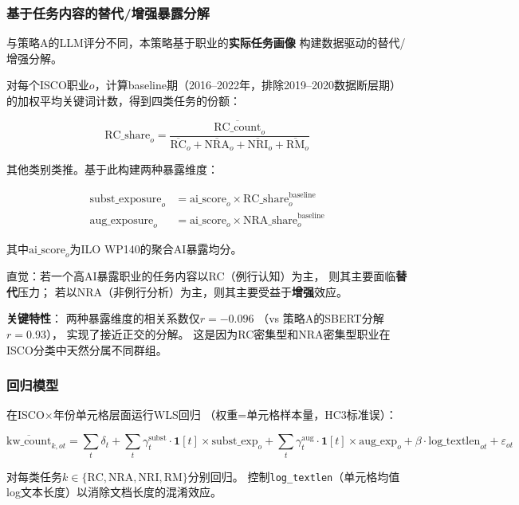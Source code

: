 \documentclass[12pt,a4paper]{ctexart}
\begin{document}
\subsubsection{基于任务内容的替代/增强暴露分解}

与策略A的LLM评分不同，本策略基于职业的\textbf{实际任务画像}
构建数据驱动的替代/增强分解。

对每个ISCO职业$o$，计算baseline期（2016--2022年，排除2019--2020数据断层期）
的加权平均关键词计数，得到四类任务的份额：

\[
\text{RC\_share}_o = \frac{\overline{\text{RC\_count}}_o}
{\overline{\text{RC}}_o + \overline{\text{NRA}}_o + \overline{\text{NRI}}_o + \overline{\text{RM}}_o}
\]

其他类别类推。基于此构建两种暴露维度：

\begin{align}
\text{subst\_exposure}_o &= \text{ai\_score}_o \times \text{RC\_share}_o^{\text{baseline}}
\label{eq:subst} \\
\text{aug\_exposure}_o &= \text{ai\_score}_o \times \text{NRA\_share}_o^{\text{baseline}}
\label{eq:aug}
\end{align}

其中$\text{ai\_score}_o$为ILO WP140的聚合AI暴露均分。

直觉：若一个高AI暴露职业的任务内容以RC（例行认知）为主，
则其主要面临\textbf{替代}压力；
若以NRA（非例行分析）为主，则其主要受益于\textbf{增强}效应。

\textbf{关键特性}：
两种暴露维度的相关系数仅$r = -0.096$
（vs 策略A的SBERT分解$r=0.93$），
实现了接近正交的分解。
这是因为RC密集型和NRA密集型职业在ISCO分类中天然分属不同群组。

\subsubsection{回归模型}

在ISCO$\times$年份单元格层面运行WLS回归
（权重=单元格样本量，HC3标准误）：

\begin{equation}
\overline{\text{kw\_count}}_{k,ot} = \sum_t \delta_t
+ \sum_t \gamma_t^{\text{subst}} \cdot \mathbf{1}[t] \times \text{subst\_exp}_o
+ \sum_t \gamma_t^{\text{aug}} \cdot \mathbf{1}[t] \times \text{aug\_exp}_o
+ \beta \cdot \text{log\_textlen}_{ot}
+ \varepsilon_{ot}
\label{eq:task_wls}
\end{equation}

对每类任务$k \in \{\text{RC}, \text{NRA}, \text{NRI}, \text{RM}\}$分别回归。
控制\texttt{log\_textlen}（单元格均值log文本长度）以消除文档长度的混淆效应。
\end{document}
